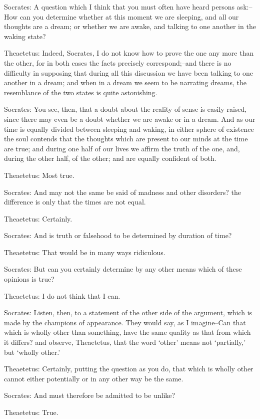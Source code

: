 Socrates: A question which I think that you must often have heard
persons ask:--How can you determine whether at this moment we are
sleeping, and all our thoughts are a dream; or whether we are awake, and
talking to one another in the waking state?

Theaetetus: Indeed, Socrates, I do not know how to prove the one
any more than the other, for in both cases the facts precisely
correspond;--and there is no difficulty in supposing that during all
this discussion we have been talking to one another in a dream; and when
in a dream we seem to be narrating dreams, the resemblance of the two
states is quite astonishing.

Socrates: You see, then, that a doubt about the reality of sense is
easily raised, since there may even be a doubt whether we are awake
or in a dream. And as our time is equally divided between sleeping
and waking, in either sphere of existence the soul contends that the
thoughts which are present to our minds at the time are true; and during
one half of our lives we affirm the truth of the one, and, during the
other half, of the other; and are equally confident of both.

Theaetetus: Most true.

Socrates: And may not the same be said of madness and other disorders?
the difference is only that the times are not equal.

Theaetetus: Certainly.

Socrates: And is truth or falsehood to be determined by duration of
time?

Theaetetus: That would be in many ways ridiculous.

Socrates: But can you certainly determine by any other means which of
these opinions is true?

Theaetetus: I do not think that I can.

Socrates: Listen, then, to a statement of the other side of the
argument, which is made by the champions of appearance. They would say,
as I imagine--Can that which is wholly other than something, have the
same quality as that from which it differs? and observe, Theaetetus,
that the word `other' means not `partially,' but `wholly other.'

Theaetetus: Certainly, putting the question as you do, that which is
wholly other cannot either potentially or in any other way be the same.

Socrates: And must therefore be admitted to be unlike?

Theaetetus: True.

